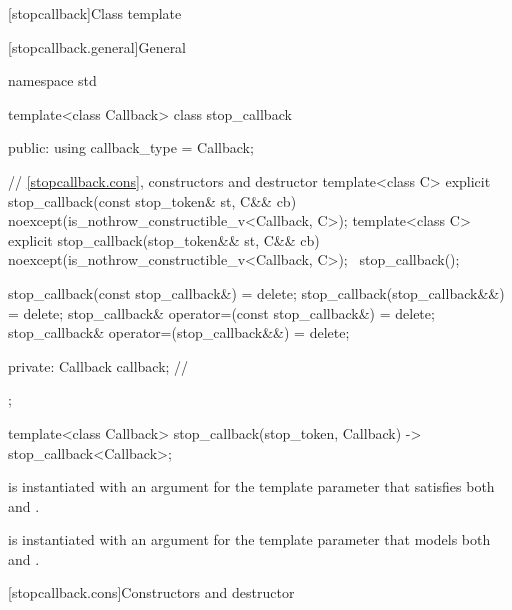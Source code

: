 [stopcallback]{Class template }%
%

[stopcallback.general]{General}

\pnum
{}%
\begin{codeblock}
namespace std {
  template<class Callback>
  class stop_callback {
  public:
    using callback_type = Callback;

    // \ref{stopcallback.cons}, constructors and destructor
    template<class C>
      explicit stop_callback(const stop_token& st, C&& cb)
        noexcept(is_nothrow_constructible_v<Callback, C>);
    template<class C>
      explicit stop_callback(stop_token&& st, C&& cb)
        noexcept(is_nothrow_constructible_v<Callback, C>);
    ~stop_callback();

    stop_callback(const stop_callback&) = delete;
    stop_callback(stop_callback&&) = delete;
    stop_callback& operator=(const stop_callback&) = delete;
    stop_callback& operator=(stop_callback&&) = delete;

  private:
    Callback callback;      // \expos
  };

  template<class Callback>
    stop_callback(stop_token, Callback) -> stop_callback<Callback>;
}
\end{codeblock}

\pnum
\mandates
{} is instantiated with an argument for the
template parameter 
that satisfies both 
and .

\pnum
\expects
{} is instantiated with an argument for the
template parameter 
that models both 
and .


[stopcallback.cons]{Constructors and destructor}

